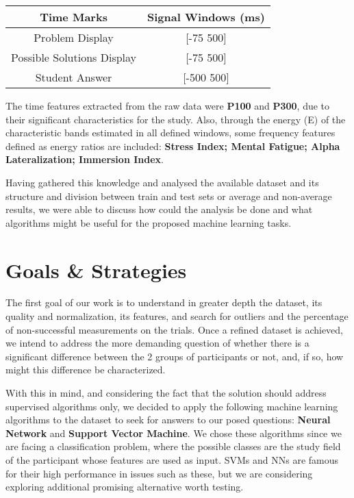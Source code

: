 \documentclass[conference]{IEEEtran}
\begin{document}
\begin{table}[h!]
    \begin{center}
        \begin{tabular}{c|c} %
            \textbf{Time Marks} & \textbf{Signal Windows (ms)}\\
            \hline
            Problem Display & [-75 500] \\
            Possible Solutions Display & [-75 500] \\
            Student Answer & [-500 500] \\
        \end{tabular}
    \end{center}
    \caption{}
\end{table}
\vspace{-15pt}

The time features extracted from the raw data were \textbf{P100} and \textbf{P300}, 
due to their significant characteristics for the study.
Also, through the energy (E) of the characteristic bands estimated in all defined
windows, some frequency features defined as energy ratios are included:
\textbf{Stress Index; Mental Fatigue; Alpha Lateralization; Immersion Index}.

Having gathered this knowledge and analysed the available dataset and its structure
and division between train and test sets or average and non-average results, we
were able to discuss how could the analysis be done and what algorithms might
be useful for the proposed machine learning tasks.

\newpage
\section{Goals \& Strategies}

The first goal of our work is to understand in greater depth the dataset, its 
quality and normalization, its features, and search for outliers and the 
percentage of non-successful measurements on the trials.
Once a refined dataset is achieved, we intend to address the more demanding 
question of whether there is a significant difference between the 2 groups of 
participants or not, and, if so, how might this difference be characterized.

With this in mind, and considering the fact that the solution should address 
supervised algorithms only, we decided to apply the following machine learning 
algorithms to the dataset to seek for answers to our posed questions:
\textbf{Neural Network} and \textbf{Support Vector Machine}.
We chose these algorithms since we are facing a classification problem, where 
the possible classes are the study field of the participant whose features are 
used as input.
SVMs and NNs are famous for their high performance in issues such as these, but
we are considering exploring additional promising alternative worth testing.
\end{document}
